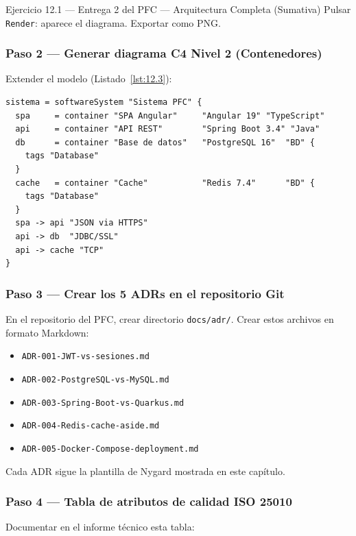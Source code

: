 \documentclass[11pt,a4paper,openany]{book}
\begin{document}
\begin{cajaejercicio}{Ejercicio 12.1 --- Entrega 2 del PFC --- Arquitectura Completa (Sumativa)}
Pulsar \texttt{Render}: aparece el diagrama. Exportar como PNG.

\subsubsection*{Paso 2 --- Generar diagrama C4 Nivel 2 (Contenedores)}

Extender el modelo (Listado~\ref{lst:12.3}):

\begin{lstlisting}[style=shell,numbers=none,caption={Ejemplo de Shell},label=lst:12.3]
sistema = softwareSystem "Sistema PFC" {
  spa     = container "SPA Angular"     "Angular 19" "TypeScript"
  api     = container "API REST"        "Spring Boot 3.4" "Java"
  db      = container "Base de datos"   "PostgreSQL 16"  "BD" {
    tags "Database"
  }
  cache   = container "Cache"           "Redis 7.4"      "BD" {
    tags "Database"
  }
  spa -> api "JSON via HTTPS"
  api -> db  "JDBC/SSL"
  api -> cache "TCP"
}
\end{lstlisting}

\subsubsection*{Paso 3 --- Crear los 5 ADRs en el repositorio Git}

En el repositorio del PFC, crear directorio \texttt{docs/adr/}.
Crear estos archivos en formato Markdown:

\begin{itemize}
\item \texttt{ADR-001-JWT-vs-sesiones.md}
\item \texttt{ADR-002-PostgreSQL-vs-MySQL.md}
\item \texttt{ADR-003-Spring-Boot-vs-Quarkus.md}
\item \texttt{ADR-004-Redis-cache-aside.md}
\item \texttt{ADR-005-Docker-Compose-deployment.md}
\end{itemize}

Cada ADR sigue la plantilla de Nygard mostrada en este capítulo.

\subsubsection*{Paso 4 --- Tabla de atributos de calidad ISO 25010}

Documentar en el informe técnico esta tabla:


\end{cajaejercicio}
\end{document}
